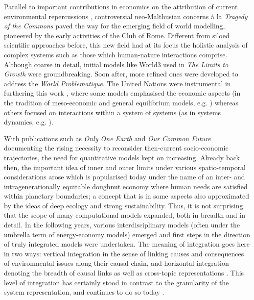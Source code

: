 \documentclass{article}
\begin{document}
\begin{refsection}
Parallel to important contributions in economics on the attribution of current environmental repercussions \parencite[see for example][]{leontief_1970,leontief_1972}, controversial neo-Malthusian concerns à la \textit{Tragedy of the Commons} \parencite{hardin_1968,ostrom_1999,mildenberger_2019} paved the way for the emerging field of world modelling, pioneered by the early activities of the Club of Rome. Different from siloed scientific approaches before, this new field had at its focus the holistic analysis of complex systems such as those which human-nature interactions comprise. Although coarse in detail, initial models like World3 used in \textit{The Limits to Growth} \parencite{meadows_1972} were groundbreaking. Soon after, more refined ones were developed to address the \textit{World Problematique}. The United Nations were instrumental in furthering this work \parencite{fontela_2004}, where some models emphasised the economic aspects (in the tradition of meso-economic and general equilibrium models, e.g. \textcite{leontief_1974}) whereas others focused on interactions within a system of systems (as in systems dynamics, e.g. \textcite{mesarovic_1974}).

With publications such as \textit{Only One Earth} \parencite{ward_1972} and \textit{Our Common Future} \parencite*[WCED,][]{brundtland_1987} documenting the rising necessity to reconsider then-current socio-economic trajectories, the need for quantitative models kept on increasing. Already back then, the important idea of inner and outer limits under various spatio-temporal considerations arose which is popularised today under the name of an inter- and intragenerationally equitable doughnut economy where human needs are satisfied within planetary boundaries; a concept that is in some aspects also approximated by the ideas of deep ecology and strong sustainability. Thus, it is not surprising that the scope of many computational models expanded, both in breadth and in detail. In the following years, various interdisciplinary models (often under the umbrella term of energy-economy models) emerged and first steps in the direction of truly integrated models were undertaken. The meaning of integration goes here in two ways: vertical integration in the sense of linking causes and consequences of environmental issues along their causal chain, and horizontal integration denoting the breadth of causal links as well as cross-topic representations \parencite{parson_1997}. This level of integration has certainly stood in contrast to the granularity of the system representation, and continues to do so today \parencite{krey_2014}.


\end{refsection}
\end{document}

